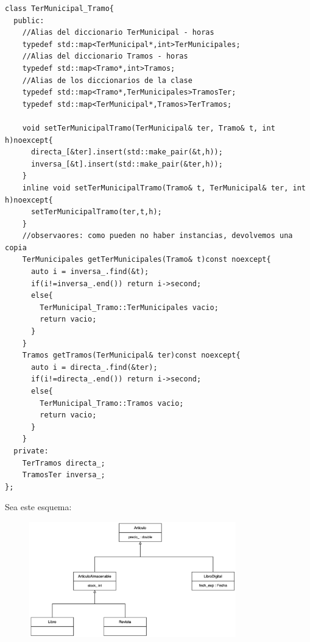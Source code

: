 \begin{verbatim}
class TerMunicipal_Tramo{
  public:
    //Alias del diccionario TerMunicipal - horas
    typedef std::map<TerMunicipal*,int>TerMunicipales;
    //Alias del diccionario Tramos - horas
    typedef std::map<Tramo*,int>Tramos;
    //Alias de los diccionarios de la clase 
    typedef std::map<Tramo*,TerMunicipales>TramosTer;
    typedef std::map<TerMunicipal*,Tramos>TerTramos;

    void setTerMunicipalTramo(TerMunicipal& ter, Tramo& t, int h)noexcept{
      directa_[&ter].insert(std::make_pair(&t,h));
      inversa_[&t].insert(std::make_pair(&ter,h));
    }
    inline void setTerMunicipalTramo(Tramo& t, TerMunicipal& ter, int h)noexcept{
      setTerMunicipalTramo(ter,t,h);
    }
    //observaores: como pueden no haber instancias, devolvemos una copia
    TerMunicipales getTerMunicipales(Tramo& t)const noexcept{
      auto i = inversa_.find(&t);
      if(i!=inversa_.end()) return i->second;
      else{
        TerMunicipal_Tramo::TerMunicipales vacio;
        return vacio;
      }
    }
    Tramos getTramos(TerMunicipal& ter)const noexcept{
      auto i = directa_.find(&ter);
      if(i!=directa_.end()) return i->second;
      else{
        TerMunicipal_Tramo::Tramos vacio;
        return vacio;
      }
    }
  private:
    TerTramos directa_;
    TramosTer inversa_;
};
\end{verbatim}

 Sea este esquema:
\begin{figure}[h]
  \begin{center}
    \includegraphics[width=0.8\textwidth]{assets/Junio2023_2.png}
  \end{center}
\end{figure}


